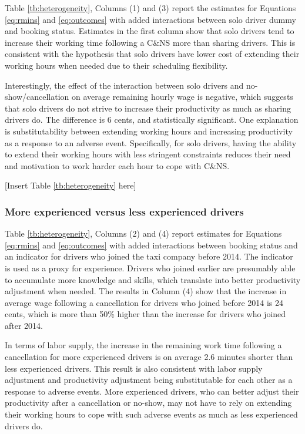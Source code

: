 \documentclass[reviewmode]{restat}
\begin{document}
Table \ref{tb:heterogeneity}, Columns (1) and (3) report the estimates for Equations \eqref{eq:rmins} 
and \eqref{eq:outcomes} with added interactions between solo driver dummy and booking status. Estimates
in the first column show that solo drivers tend to increase their working time following a C\&NS more
than sharing drivers. This is consistent with the hypothesis that solo drivers have lower cost of extending
their working hours when needed due to their scheduling flexibility.

Interestingly, the effect of the interaction between solo drivers and no-show/cancellation on average
remaining hourly wage is negative, which suggests that solo drivers do not strive to increase their 
productivity as much as sharing drivers do. The difference is 6 cents, and statistically significant.
One explanation is substitutability between extending working hours and increasing productivity as a 
response to an adverse event. Specifically, for solo drivers, having the ability to extend their working
hours with less stringent constraints reduces their need and motivation to work harder each hour to cope
with C\&NS.

\begin{center}
	[Insert Table \ref{tb:heterogeneity} here]
\end{center}


\subsubsection{More experienced versus less experienced drivers}

Table \ref{tb:heterogeneity}, Columns (2) and (4) report estimates for Equations \eqref{eq:rmins} and 
\eqref{eq:outcomes} with added interactions between booking status and an indicator for drivers who 
joined the taxi company before 2014. The indicator is used as a proxy for experience. Drivers who joined
earlier are presumably able to accumulate more knowledge and skills, which translate into better
productivity adjustment when needed. The results in Column (4) show that the increase in average wage 
following a cancellation for drivers who joined before 2014 is 24 cents, which is more than 50\% higher
than the increase for drivers who joined after 2014.

In terms of labor supply, the increase in the remaining work time following a cancellation for more 
experienced drivers is on average 2.6 minutes shorter than less experienced drivers. This result is also
consistent with labor supply adjustment and productivity adjustment being substitutable for each other as
a response to adverse events. More experienced drivers, who can better adjust their productivity after a 
cancellation or no-show, may not have to rely on extending their working hours to cope with such adverse 
events as much as less experienced drivers do.
\end{document}
